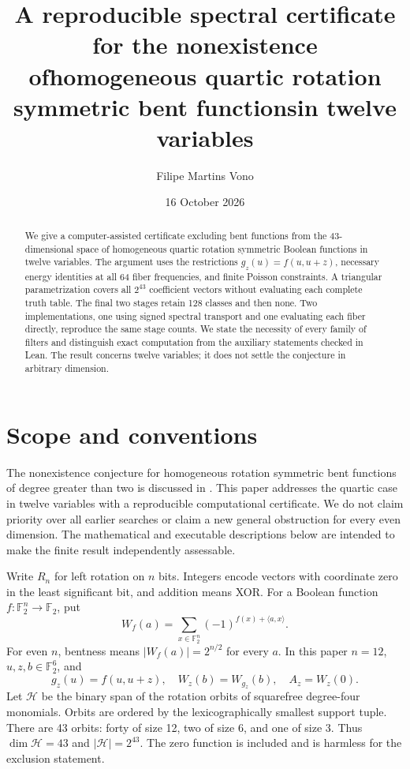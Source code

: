 \documentclass[11pt,a4paper]{article}
\title{A reproducible spectral certificate for the nonexistence of\newline homogeneous quartic rotation symmetric bent functions\newline in twelve variables}
\author{Filipe Martins Vono}
\date{16 October 2026}
\newcommand{\F}{\mathbb F_2}
\begin{document}
\maketitle
\begin{abstract}
We give a computer-assisted certificate excluding bent functions from the
43-dimensional space of homogeneous quartic rotation symmetric Boolean
functions in twelve variables. The argument uses the restrictions
$g_z(u)=f(u,u+z)$, necessary energy identities at all 64 fiber frequencies,
and finite Poisson constraints. A triangular parametrization covers all
$2^{43}$ coefficient vectors without evaluating each complete truth table.
The final two stages retain 128 classes and then none. Two implementations,
one using signed spectral transport and one evaluating each fiber directly,
reproduce the same stage counts. We state the necessity of every family of
filters and distinguish exact computation from the auxiliary statements
checked in Lean. The result concerns twelve variables; it does not settle
the conjecture in arbitrary dimension.
\end{abstract}

\section{Scope and conventions}
The nonexistence conjecture for homogeneous rotation symmetric bent
functions of degree greater than two is discussed in
\cite{SM,MCF,Sun}. This paper addresses the quartic case in twelve
variables with a reproducible computational certificate. We do not claim
priority over all earlier searches or claim a new general obstruction
for every even dimension. The mathematical and executable descriptions
below are intended to make the finite result independently assessable.

Write $R_n$ for left rotation on $n$ bits. Integers encode vectors with
coordinate zero in the least significant bit, and addition means XOR.
For a Boolean function $f:\F^n\to\F$, put
\[
 W_f(a)=\sum_{x\in\F^n}(-1)^{f(x)+\langle a,x\rangle}.
\]
For even $n$, bentness means $|W_f(a)|=2^{n/2}$ for every $a$.
In this paper $n=12$, $u,z,b\in\F^6$, and
\[
 g_z(u)=f(u,u+z),\quad W_z(b)=W_{g_z}(b),\quad A_z=W_z(0).
\]
Let $\mathcal H$ be the binary span of the rotation orbits of squarefree
degree-four monomials. Orbits are ordered by the lexicographically smallest
support tuple. There are 43 orbits: forty of size 12, two of size 6, and
one of size 3. Thus $\dim\mathcal H=43$ and $|\mathcal H|=2^{43}$.
The zero function is included and is harmless for the exclusion statement.
\end{document}
